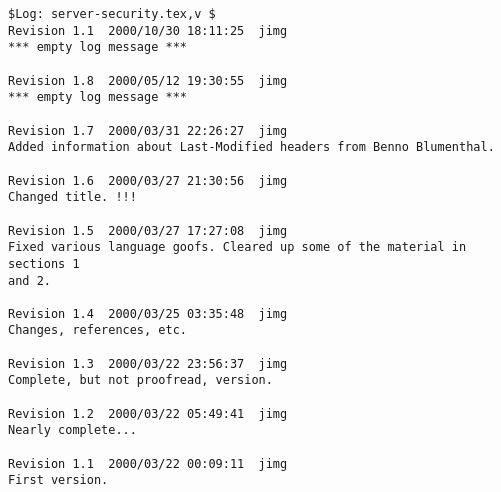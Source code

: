 \documentclass{article}
\begin{document}
\begin{verbatim}
$Log: server-security.tex,v $
Revision 1.1  2000/10/30 18:11:25  jimg
*** empty log message ***

Revision 1.8  2000/05/12 19:30:55  jimg
*** empty log message ***

Revision 1.7  2000/03/31 22:26:27  jimg
Added information about Last-Modified headers from Benno Blumenthal.

Revision 1.6  2000/03/27 21:30:56  jimg
Changed title. !!!

Revision 1.5  2000/03/27 17:27:08  jimg
Fixed various language goofs. Cleared up some of the material in sections 1
and 2.

Revision 1.4  2000/03/25 03:35:48  jimg
Changes, references, etc.

Revision 1.3  2000/03/22 23:56:37  jimg
Complete, but not proofread, version.

Revision 1.2  2000/03/22 05:49:41  jimg
Nearly complete...

Revision 1.1  2000/03/22 00:09:11  jimg
First version.

\end{verbatim}


\raggedright


\end{document}

